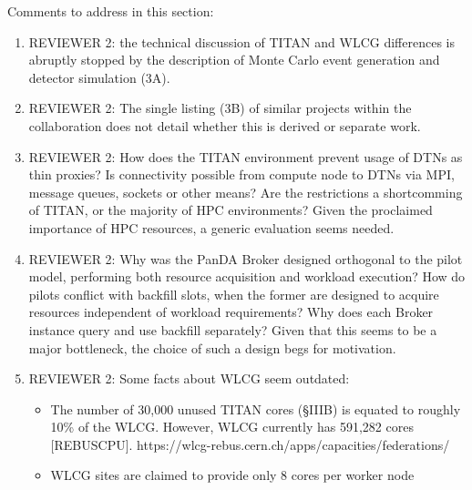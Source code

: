 \ifreview
Comments to address in this section:
\begin{enumerate}
	\color{red} 
	\item REVIEWER 2: the technical discussion of TITAN and WLCG differences
	is abruptly stopped by the description of Monte Carlo event generation
	and detector simulation (3A).
	\item REVIEWER 2: The single listing (3B) of similar projects within the
	collaboration does not detail whether this is derived or separate
	work.
	\item REVIEWER 2: How does the TITAN environment prevent usage of DTNs as
	thin proxies? Is connectivity possible from compute node to DTNs via MPI,
	message queues, sockets or other means? Are the restrictions a
	shortcomming of TITAN, or the majority of HPC environments? Given the
	proclaimed importance of HPC resources, a generic evaluation seems
	needed.
	\item REVIEWER 2: Why was the PanDA Broker designed orthogonal to the
	pilot model, performing both resource acquisition and workload
	execution? How do pilots conflict with backfill slots, when the
	former are designed to acquire resources independent of workload
	requirements?
	Why does each Broker instance query and use backfill separately? Given
	that this seems to be a major bottleneck, the choice of such a design
	begs for motivation.
	\item REVIEWER 2: Some facts about WLCG seem outdated:
	\begin{itemize}
		\item The number of 30,000 unused TITAN cores (§IIIB) is equated to
		roughly 10\% of the WLCG. However, WLCG currently has 591,282 cores
		[REBUSCPU].
		https://wlcg-rebus.cern.ch/apps/capacities/federations/
		\item WLCG sites are claimed to provide only 8 cores per worker node

\end{itemize}
\end{enumerate}
